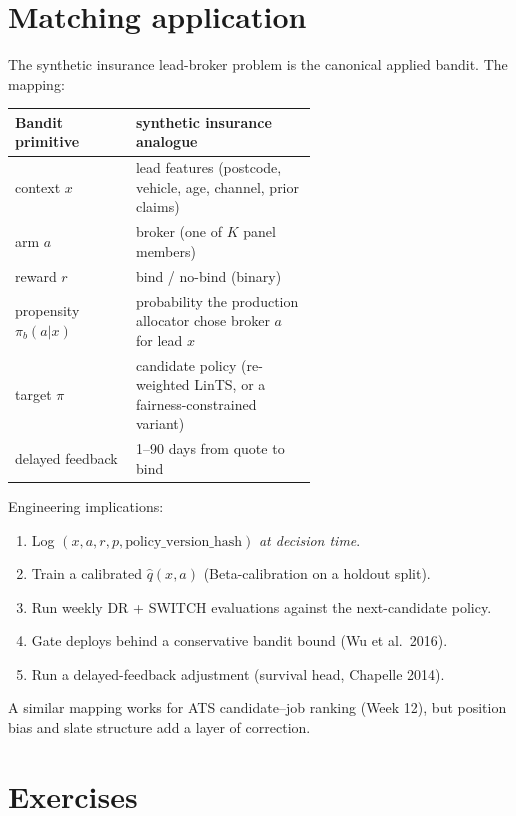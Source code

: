 \documentclass[11pt,oneside]{scrbook}
\begin{document}
\chapter{Matching application}

\begin{matching}
The synthetic insurance lead-broker problem is the canonical applied bandit. The mapping:

\begin{center}
\begin{tabular}{lp{0.6\linewidth}}
\toprule
Bandit primitive & synthetic insurance analogue \\
\midrule
context $x$ & lead features (postcode, vehicle, age, channel, prior claims) \\
arm $a$ & broker (one of $K$ panel members) \\
reward $r$ & bind / no-bind (binary) \\
propensity $\pi_b(a|x)$ & probability the production allocator chose broker $a$ for lead $x$ \\
target $\pi$ & candidate policy (re-weighted LinTS, or a fairness-constrained variant) \\
delayed feedback & 1--90 days from quote to bind \\
\bottomrule
\end{tabular}
\end{center}

Engineering implications:
\begin{enumerate}\setlength\itemsep{1pt}
  \item Log $(x, a, r, p, \text{policy\_version\_hash})$ \emph{at decision time}.
  \item Train a calibrated $\hat q(x, a)$ (Beta-calibration on a holdout split).
  \item Run weekly DR + SWITCH evaluations against the next-candidate policy.
  \item Gate deploys behind a conservative bandit bound (Wu et al.\ 2016).
  \item Run a delayed-feedback adjustment (survival head, Chapelle 2014).
\end{enumerate}

A similar mapping works for ATS candidate--job ranking (Week 12), but
position bias and slate structure add a layer of correction.
\end{matching}

\chapter{Exercises}
\end{document}
